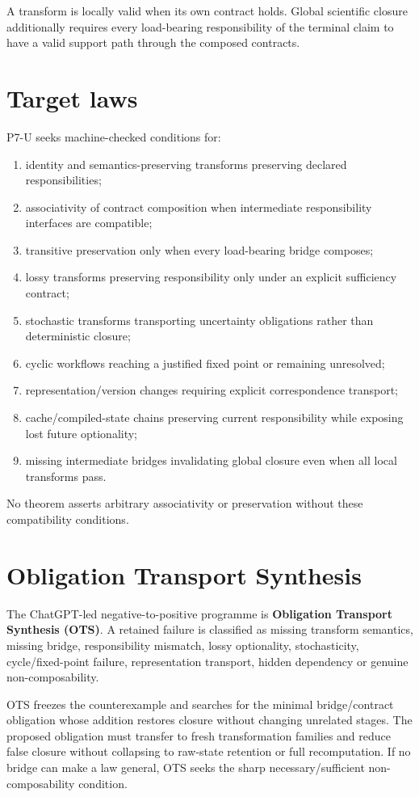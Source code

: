 \documentclass[11pt]{article}
\begin{document}
A transform is locally valid when its own contract holds. Global scientific closure additionally requires every load-bearing responsibility of the terminal claim to have a valid support path through the composed contracts.

\section{Target laws}
P7-U seeks machine-checked conditions for:
\begin{enumerate}
    \item identity and semantics-preserving transforms preserving declared responsibilities;
    \item associativity of contract composition when intermediate responsibility interfaces are compatible;
    \item transitive preservation only when every load-bearing bridge composes;
    \item lossy transforms preserving responsibility only under an explicit sufficiency contract;
    \item stochastic transforms transporting uncertainty obligations rather than deterministic closure;
    \item cyclic workflows reaching a justified fixed point or remaining unresolved;
    \item representation/version changes requiring explicit correspondence transport;
    \item cache/compiled-state chains preserving current responsibility while exposing lost future optionality;
    \item missing intermediate bridges invalidating global closure even when all local transforms pass.
\end{enumerate}

No theorem asserts arbitrary associativity or preservation without these compatibility conditions.

\section{Obligation Transport Synthesis}
The ChatGPT-led negative-to-positive programme is \textbf{Obligation Transport Synthesis (OTS)}. A retained failure is classified as missing transform semantics, missing bridge, responsibility mismatch, lossy optionality, stochasticity, cycle/fixed-point failure, representation transport, hidden dependency or genuine non-composability.

OTS freezes the counterexample and searches for the minimal bridge/contract obligation whose addition restores closure without changing unrelated stages. The proposed obligation must transfer to fresh transformation families and reduce false closure without collapsing to raw-state retention or full recomputation. If no bridge can make a law general, OTS seeks the sharp necessary/sufficient non-composability condition.
\end{document}
